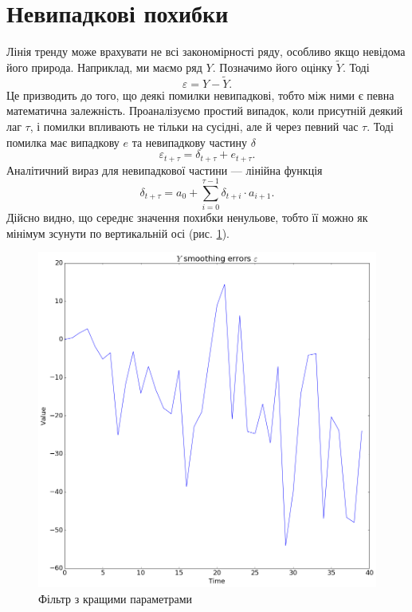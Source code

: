 \section{Невипадкові похибки}

Лінія тренду може врахувати не всі закономірності ряду,
особливо якщо невідома його природа.
Наприклад, ми маємо ряд $Y$.
Позначимо його оцінку $\tilde{Y}$.
Тоді
\begin{equation*}
  \varepsilon = Y - \tilde{Y}.
\end{equation*}
Це призводить до того, що деякі помилки невипадкові,
тобто між ними є певна математична залежність.
Проаналізуємо простий випадок,
коли присутній деякий лаг $\tau$,
і помилки впливають не тільки на сусідні,
але й через певний час $\tau$.
Тоді помилка має випадкову $e$ та невипадкову частину $\delta$
\begin{equation*}
  \varepsilon_{t + \tau} = \delta_{t + \tau} + e_{t + \tau}.
\end{equation*}
Аналітичний вираз для невипадкової частини --- лінійна функція
\begin{equation}\label{nonrandom_error:eq}
  \delta_{t + \tau}
  = a_0 + \sum_{i = 0}^{\tau - 1} \delta_{t + i} \cdot a_{i + 1}.
\end{equation}
Дійсно видно, що середнє значення похибки ненульове,
тобто її можно як мінімум зсунути по вертикальній осі
(рис. \ref{fig:error:source}).
\begin{figure}[h!]
  \centering
  \includegraphics[width=\textwidth]{Coursework_files/Coursework_27_0.png}
  \caption{Фільтр з кращими параметрами}
  \label{fig:error:source}
\end{figure}

